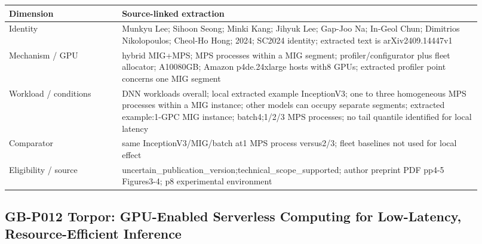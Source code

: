 \documentclass[12pt,a4paper]{article}
\begin{document}
{\small\begin{longtable}{>{\raggedright\arraybackslash}p{0.22\linewidth}>{\raggedright\arraybackslash}p{0.7\linewidth}}
\toprule
Dimension & Source-linked extraction\\\midrule
\endhead
Identity & Munkyu Lee; Sihoon Seong; Minki Kang; Jihyuk Lee; Gap-Joo Na; In-Geol Chun; Dimitrios Nikolopoulos; Cheol-Ho Hong; 2024; SC2024 identity; extracted text is arXiv2409.14447v1\\
Mechanism /\allowbreak{} GPU & hybrid MIG+MPS; MPS processes within a MIG segment; profiler/\allowbreak{}configurator plus fleet allocator; A10080GB; Amazon p4de.24xlarge hosts with8 GPUs; extracted profiler point concerns one MIG segment\\
Workload /\allowbreak{} conditions & 11 DNN workloads overall; local extracted example InceptionV3; one to three homogeneous MPS processes within a MIG instance; other models can occupy separate segments; extracted example:\allowbreak{}1-GPC MIG instance; batch4;1/\allowbreak{}2/\allowbreak{}3 MPS processes; no tail quantile identified for local latency\\
Comparator & same InceptionV3/\allowbreak{}MIG/\allowbreak{}batch at1 MPS process versus2/\allowbreak{}3; fleet baselines not used for local effect\\
Eligibility /\allowbreak{} source & uncertain\_\allowbreak{}publication\_\allowbreak{}version;technical\_\allowbreak{}scope\_\allowbreak{}supported; author preprint PDF pp4-5 Figures3-4; p8 experimental environment\\
\bottomrule
\end{longtable}}

\subsection*{GB-P012 Torpor:\allowbreak{} GPU-Enabled Serverless Computing for Low-Latency, Resource-Efficient Inference}
\cite{GB-P012}
\end{document}
